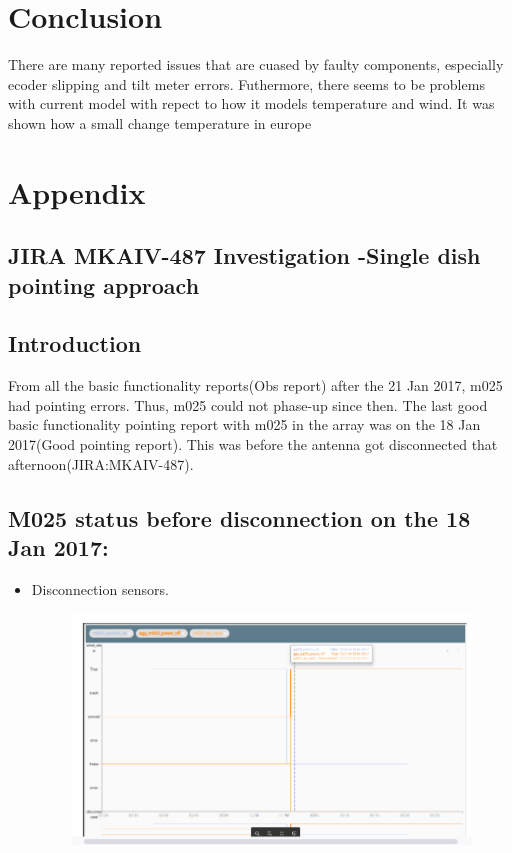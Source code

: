 \documentclass{article}
\begin{document}
{	
	
	
	\section{Conclusion}
	There are many reported issues that are cuased by faulty components, especially ecoder slipping and tilt meter errors. Futhermore, there seems to be problems with current model with repect to how it models temperature and wind.  It was shown how a small change temperature in europe
	
	\clearpage
	
	
	
	\clearpage
\section{Appendix}
\appendix
\begin{appendices}
\section{JIRA MKAIV-487 Investigation -Single dish pointing approach  }\label{sec.py1}
\subsection{Introduction}
From all the basic functionality reports(Obs report) after the 21 Jan 2017, m025 had pointing errors.  Thus, m025 could not phase-up since then.  The last good basic functionality pointing report with m025 in the array was on the 18 Jan 2017(Good pointing report).  This was before the antenna got disconnected that afternoon(JIRA:MKAIV-487).   

\subsection{M025 status before disconnection on the 18 Jan 2017:}
\begin{itemize}
\item Disconnection sensors.  
\begin{figure}[H]
	\centering
	\includegraphics[scale=0.33]{m025_investigate.png}
	

\end{figure}
\end{itemize}
\end{appendices}}
\end{document}
